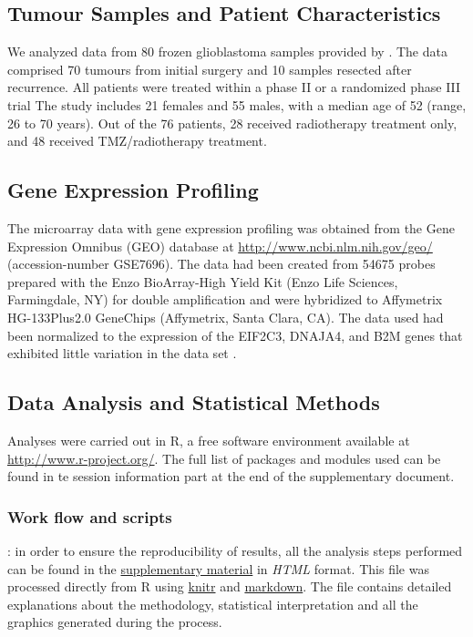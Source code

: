 \documentclass[9pt,twocolumn,twoside]{gsajnl}
\begin{document}
\subsection*{Tumour Samples and Patient Characteristics}

We analyzed data from 80 frozen glioblastoma samples provided by \cite{Murat2008}. The data comprised 70 tumours from initial surgery and 10 samples resected after recurrence. All patients were treated within a phase II or a randomized phase III trial \citep{Stupp2002,Stupp2005}
The study includes 21 females and 55 males, with a median age of 52 (range, 26 to 70 years). Out of the 76 patients, 28 received radiotherapy treatment only, and 48 received TMZ/radiotherapy treatment. 

\subsection*{Gene Expression Profiling}

The microarray data with gene expression profiling was obtained from the Gene Expression Omnibus (GEO) database at \url{http://www.ncbi.nlm.nih.gov/geo/} (accession-number GSE7696). The data had been created from 54675 probes prepared with the Enzo BioArray-High Yield Kit (Enzo Life Sciences, Farmingdale, NY) for double amplification and were hybridized to Affymetrix HG-133Plus2.0 GeneChips (Affymetrix, Santa Clara, CA). The data used had been normalized to the expression of the EIF2C3, DNAJA4, and B2M genes that exhibited little variation in the data set \citep{Murat2008}.

\subsection*{Data Analysis and Statistical Methods}
Analyses were carried out in R, a free software environment available at \url{http://www.r-project.org/}. The full list of packages and modules used can be found in te session information part at the end of the supplementary document. 

\subsubsection*{Work flow and scripts}: in order to ensure the reproducibility of results, all the analysis steps performed can be found in the \href{http://ieoproject.tk/ieo/abella_casals_miravet.html}{supplementary material} in \textit{HTML} format. This file was processed directly from R using 
\href{http://cran.r-project.org/web/packages/knitr/index.html}{knitr} and \href{http://cran.r-project.org/web/packages/markdown/index.html}{markdown}. The file contains detailed explanations about the methodology, statistical interpretation and all the graphics generated during the process. 
\end{document}
